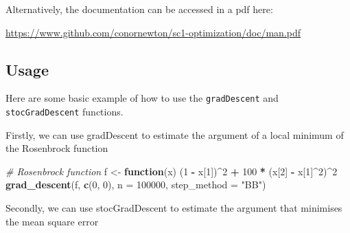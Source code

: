 \documentclass[12pt,]{article}
\newenvironment{Shaded}{\begin{snugshade}}{\end{snugshade}}
\newcommand{\CommentTok}[1]{\textcolor[rgb]{0.56,0.35,0.01}{\textit{#1}}}
\newcommand{\ControlFlowTok}[1]{\textcolor[rgb]{0.13,0.29,0.53}{\textbf{#1}}}
\newcommand{\DataTypeTok}[1]{\textcolor[rgb]{0.13,0.29,0.53}{#1}}
\newcommand{\DecValTok}[1]{\textcolor[rgb]{0.00,0.00,0.81}{#1}}
\newcommand{\KeywordTok}[1]{\textcolor[rgb]{0.13,0.29,0.53}{\textbf{#1}}}
\newcommand{\NormalTok}[1]{#1}
\newcommand{\OperatorTok}[1]{\textcolor[rgb]{0.81,0.36,0.00}{\textbf{#1}}}
\newcommand{\StringTok}[1]{\textcolor[rgb]{0.31,0.60,0.02}{#1}}
\begin{document}
Alternatively, the documentation can be accessed in a pdf here:

\url{https://www.github.com/conornewton/sc1-optimization/doc/man.pdf}

\hypertarget{usage}{%
\subsection{Usage}\label{usage}}

Here are some basic example of how to use the \texttt{gradDescent} and
\texttt{stocGradDescent} functions.

Firstly, we can use gradDescent to estimate the argument of a local
minimum of the Rosenbrock function

\begin{Shaded}
\begin{Highlighting}[]
    \CommentTok{# Rosenbrock function}
\NormalTok{    f <-}\StringTok{ }\ControlFlowTok{function}\NormalTok{(x) (}\DecValTok{1} \OperatorTok{-}\StringTok{ }\NormalTok{x[}\DecValTok{1}\NormalTok{])}\OperatorTok{^}\DecValTok{2} \OperatorTok{+}\StringTok{ }\DecValTok{100} \OperatorTok{*}\StringTok{ }\NormalTok{(x[}\DecValTok{2}\NormalTok{] }\OperatorTok{-}\StringTok{ }\NormalTok{x[}\DecValTok{1}\NormalTok{]}\OperatorTok{^}\DecValTok{2}\NormalTok{)}\OperatorTok{^}\DecValTok{2}
    \KeywordTok{grad_descent}\NormalTok{(f, }\KeywordTok{c}\NormalTok{(}\DecValTok{0}\NormalTok{, }\DecValTok{0}\NormalTok{), }\DataTypeTok{n =} \DecValTok{100000}\NormalTok{, }\DataTypeTok{step_method =} \StringTok{"BB"}\NormalTok{)}
\end{Highlighting}
\end{Shaded}

Secondly, we can use stocGradDescent to estimate the argument that
minimises the mean square error
\end{document}
